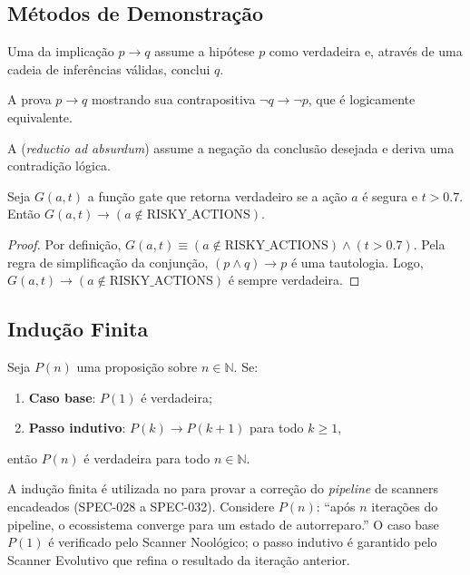 \subsection{Métodos de Demonstração}
\begin{definicao}
Uma  da implicação $p \to q$ assume a
hipótese $p$ como verdadeira e, através de uma cadeia de inferências
válidas, conclui $q$.
\end{definicao}
\begin{definicao}
A  prova $p \to q$ mostrando
sua contrapositiva $\neg q \to \neg p$, que é logicamente equivalente.
\end{definicao}
\begin{definicao}
A  (\textit{reductio ad absurdum})
assume a negação da conclusão desejada e deriva uma contradição lógica.
\end{definicao}
\begin{teorema}
Seja $G(a, t)$ a função gate que retorna verdadeiro se a ação $a$ é
segura e $t > 0.7$. Então $G(a, t) \to (a \notin \text{RISKY\_ACTIONS})$.
\end{teorema}
\begin{proof}
Por definição, $G(a, t) \equiv (a \notin \text{RISKY\_ACTIONS}) \land
(t > 0.7)$. Pela regra de simplificação da conjunção,
$(p \land q) \to p$ é uma tautologia. Logo, $G(a, t) \to
(a \notin \text{RISKY\_ACTIONS})$ é sempre verdadeira.
\end{proof}
\subsection{Indução Finita}
\begin{definicao}
Seja $P(n)$ uma proposição sobre $n \in \mathbb{N}$. Se:
\begin{enumerate}
\item \textbf{Caso base}: $P(1)$ é verdadeira;
\item \textbf{Passo indutivo}: $P(k) \to P(k+1)$ para todo $k \geq 1$,
\end{enumerate}
então $P(n)$ é verdadeira para todo $n \in \mathbb{N}$.
\end{definicao}
\begin{exemplo}
A indução finita é utilizada no \opencodeeco{} para provar a correção do
\textit{pipeline} de scanners encadeados (SPEC-028 a SPEC-032).
Considere $P(n)$: ``após $n$ iterações do pipeline, o ecossistema
converge para um estado de autorreparo.''
O caso base $P(1)$ é verificado pelo Scanner Noológico; o passo indutivo
é garantido pelo Scanner Evolutivo que refina o resultado da iteração
anterior.
\end{exemplo}
